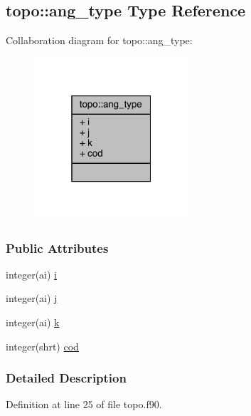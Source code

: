 \hypertarget{structtopo_1_1ang__type}{\subsection{topo\-:\-:ang\-\_\-type Type Reference}
\label{structtopo_1_1ang__type}
}


Collaboration diagram for topo\-:\-:ang\-\_\-type\-:
\nopagebreak
\begin{figure}[H]
\begin{center}
\leavevmode
\includegraphics[width=163pt]{structtopo_1_1ang__type__coll__graph}
\end{center}
\end{figure}
\subsubsection*{Public Attributes}
\begin{DoxyCompactItemize}
\item 
integer(ai) \hyperlink{structtopo_1_1ang__type_a0f3801a9d9b1b6e8cb54dbd52d86d896}{i}
\item 
integer(ai) \hyperlink{structtopo_1_1ang__type_ad5c5e5785930198a0e4fbbc5f7ee19c6}{j}
\item 
integer(ai) \hyperlink{structtopo_1_1ang__type_a92bf340692193c80422a34eb890ee17e}{k}
\item 
integer(shrt) \hyperlink{structtopo_1_1ang__type_a6d871fdd94b8090045fe2b6fb69fc167}{cod}
\end{DoxyCompactItemize}


\subsubsection{Detailed Description}


Definition at line 25 of file topo.\-f90.



